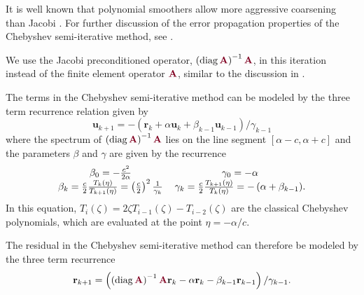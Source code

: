 It is well known that polynomial smoothers allow more aggressive coarsening than Jacobi \cite{brannick2015polynomial}.
For further discussion of the error propagation properties of the Chebyshev semi-iterative method, see \cite{gutknecht2002revisited}.

We use the Jacobi preconditioned operator, $\left( \diag {\color{burgundy}\mathbf{A}} \right)^{-1} {\color{burgundy}\mathbf{A}}$, in this iteration instead of the finite element operator ${\color{burgundy}\mathbf{A}}$, similar to the discussion in \cite{adams2003parallel}.

The terms in the Chebyshev semi-iterative method can be modeled by the three term recurrence relation given by
\begin{equation}
\mathbf{u}_{k + 1} = - \left( \mathbf{r}_k + \alpha \mathbf{u}_k + \beta_{k - 1} \mathbf{u}_{k - 1} \right) / \gamma_{k - 1}
\label{eq:chebyshev_recursive}
\end{equation}
where the spectrum of $\left( \diag {\color{burgundy}\mathbf{A}} \right)^{-1} {\color{burgundy}\mathbf{A}}$ lies on the line segment $\left[ \alpha - c, \alpha + c \right]$ and the parameters $\beta$ and $\gamma$ are given by the recurrence
\begin{equation}
\begin{tabular}{c c}
$\beta_0 = - \frac{c^2}{2 \alpha}$ & $\gamma_0 = - \alpha$\\
$\beta_k = \frac{c}{2} \frac{T_k \left( \eta \right)}{T_{k + 1} \left( \eta \right)} = \left( \frac{c}{2} \right)^2 \frac{1}{\gamma_k}$ & $\gamma_k = \frac{c}{2} \frac{T_{k + 1} \left( \eta \right)}{T_k \left( \eta \right)} = - \left( \alpha + \beta_{k - 1} \right)$.
\end{tabular}
\end{equation}
In this equation, $T_i \left( \zeta \right) = 2 \zeta T_{i - 1} \left( \zeta \right) - T_{i - 2} \left( \zeta \right)$ are the classical Chebyshev polynomials, which are evaluated at the point $\eta = - \alpha / c$.

The residual in the Chebyshev semi-iterative method can therefore be modeled by the three term recurrence
\begin{equation}
\mathbf{r}_{k + 1} = \left( \left( \diag {\color{burgundy}\mathbf{A}} \right)^{-1} {\color{burgundy}\mathbf{A}} \mathbf{r}_k - \alpha \mathbf{r}_k - \beta_{k - 1} \mathbf{r}_{k - 1} \right) / \gamma_{k - 1}.
\label{eq:chebyshev_error_recursive}
\end{equation}

